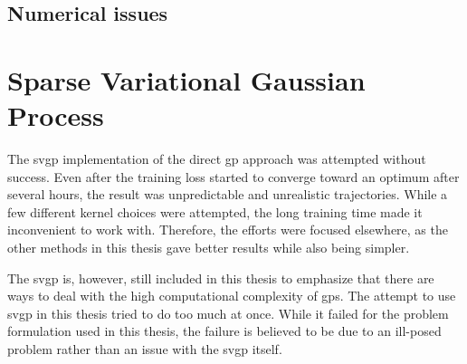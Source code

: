 \subsection{Numerical issues}



\section{Sparse Variational Gaussian Process}
The \acrshort{svgp} implementation of the direct \acrshort{gp} approach was attempted without success. Even after the training loss started to converge toward an optimum after several hours, the result was unpredictable and unrealistic trajectories. While a few different kernel choices were attempted, the long training time made it inconvenient to work with. Therefore, the efforts were focused elsewhere, as the other methods in this thesis gave better results while also being simpler. 

The \acrshort{svgp} is, however, still included in this thesis to emphasize that there are ways to deal with the high computational complexity of \acrshort{gp}s. The attempt to use \acrshort{svgp} in this thesis tried to do too much at once. While it failed for the problem formulation used in this thesis, the failure is believed to be due to an ill-posed problem rather than an issue with the \acrshort{svgp} itself.
